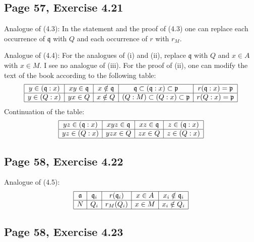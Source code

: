 \documentclass[parskip=half,fontsize=12pt]{scrartcl}%
\newcommand{\mf}{\mathfrak}
\newcommand{\aaa}{\mf a}
\newcommand{\ppp}{\mf p}
\newcommand{\qqq}{\mf q}
\begin{document}
\subsection{Page 57, Exercise 4.21}%

Analogue of (4.3): In the statement and the proof of (4.3) one can replace each occurrence of $\qqq$ with $Q$ and each occurrence of $r$ with $r_M$. 


Analogue of (4.4): For the analogues of (i) and (ii), replace $\qqq$ with $Q$ and $x\in A$ with $x\in M$. I see no analogue of (iii). For the proof of (ii), one can modify the text of the book according to the following table:  
$$
\begin{array}{|c|c|c|c|c|}\hline
y\in(\qqq:x)&xy\in\qqq&x\notin\qqq&\qqq\subset(\qqq:x)\subset\ppp&r(\qqq:x)=\ppp\\ \hline
y\in(Q:x)&yx\in Q&x\notin Q&(Q:M)\subset(Q:x)\subset\ppp&r(Q:x)=\ppp\\ \hline
\end{array}
$$ 
Continuation of the table:
$$
\begin{array}{|c|c|c|c|}\hline
yz\in(\qqq:x)&xyz\in\qqq&xz\in\qqq&z\in(\qqq:x)\\ \hline
yz\in(Q:x)&yzx\in Q&zx\in Q&z\in(Q:x)\\ \hline
\end{array}
$$ 

\subsection{Page 58, Exercise 4.22}%

Analogue of (4.5): 
$$
\begin{array}{|c|c|c|c|c|}\hline
\aaa&\qqq_i&r(\qqq_i)&x\in A&x_i\notin\qqq_i\\ \hline 
N&Q_i&r_M(Q_i)&x\in M&x_i\notin Q_i\\ \hline
\end{array}
$$ 

\subsection{Page 58, Exercise 4.23}%
\end{document}
